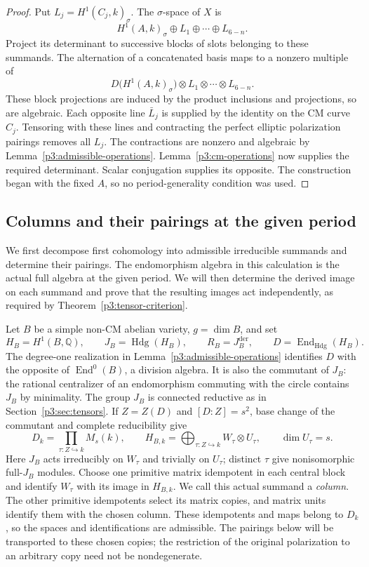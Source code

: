 \documentclass[11pt]{article}
\newcommand{\Q}{\mathbb Q}
\numberwithin{equation}{section}
\begin{document}
\begin{proof}
Put \(L_j=H^1(C_j,k)_\sigma\).  The \(\sigma\)-space of \(X\) is
\[
 H^1(A,k)_\sigma\oplus L_1\oplus\cdots\oplus L_{6-n}.
\]
Project its determinant to successive blocks of slots belonging to
these summands.  The alternation of a concatenated basis maps to a
nonzero multiple of
\[
 D\bigl(H^1(A,k)_\sigma\bigr)\otimes
 L_1\otimes\cdots\otimes L_{6-n}.
\]
These block projections are induced by the product inclusions and
projections, so are algebraic.  Each opposite line \(\bar L_j\)
is supplied by the identity on the CM curve \(C_j\).
Tensoring with these lines and contracting the perfect elliptic
polarization pairings removes all \(L_j\).  The contractions are
nonzero and algebraic by Lemma~\ref{p3:admissible-operations}.
Lemma~\ref{p3:cm-operations} now supplies the required determinant.
Scalar conjugation supplies its opposite.  The construction began
with the fixed \(A\), so no period-generality condition was used.
\end{proof}

\subsection{Columns and their pairings at the given period}

We first decompose first cohomology into admissible irreducible
summands and determine their pairings.  The endomorphism algebra
in this calculation is the actual full algebra at the given period.
We will then determine the derived image on each summand and prove
that the resulting images act independently, as required by
Theorem~\ref{p3:tensor-criterion}.

Let \(B\) be a simple non-CM abelian variety, \(g=\dim B\), and set
\[
 H_B=H^1(B,\Q),\qquad
 J_B=\operatorname{Hdg}(H_B),\qquad
 R_B=J_B^{\mathrm{der}},\qquad
 D=\operatorname{End}_{\mathrm{Hdg}}(H_B).
\]
The degree-one realization in
Lemma~\ref{p3:admissible-operations} identifies \(D\) with the
opposite of \(\operatorname{End}^0(B)\), a division algebra.
It is also the commutant of \(J_B\): the rational centralizer of
an endomorphism commuting with the circle contains \(J_B\) by
minimality.  The group \(J_B\) is connected reductive as in
Section~\ref{p3:sec:tensors}.  If \(Z=Z(D)\) and \([D:Z]=s^2\),
base change of the commutant and complete reducibility give
\begin{equation}
 \label{p3ab:eq:columns}
 D_k=\prod_{\tau:Z\hookrightarrow k}M_s(k),
 \qquad
 H_{B,k}=\bigoplus_{\tau:Z\hookrightarrow k}W_\tau\otimes U_\tau,
 \qquad \dim U_\tau=s.
\end{equation}
Here \(J_B\) acts irreducibly on \(W_\tau\) and trivially on
\(U_\tau\); distinct \(\tau\) give nonisomorphic full-\(J_B\)
modules.  Choose one primitive matrix idempotent in each central
block and identify \(W_\tau\) with its image in \(H_{B,k}\).
We call this actual summand a \emph{column}.  The other primitive
idempotents select its matrix copies, and matrix units identify
them with the chosen column.  These idempotents and maps belong
to \(D_k\), so the spaces and identifications are admissible.
The pairings below will be transported to these chosen copies;
the restriction of the original polarization to an arbitrary copy
need not be nondegenerate.
\end{document}
